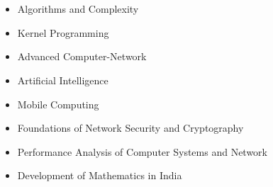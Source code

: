  \hfill \\[-0.4cm]
\hspace*{0.45cm} 
 \hfill \\[-0.8cm]

\begin{multicols}{3}
\begin{itemize}
\item Algorithms and Complexity  \\[-0.6cm]     
\item Kernel Programming \\[-0.6cm]
\item Advanced Computer-Network \\[-0.6cm]
\end{itemize}

\columnbreak
\begin{itemize}
\item Artificial Intelligence \\[-0.6cm]
\item Mobile Computing\\[-0.6cm]
\item Foundations of Network Security and Cryptography\\[-0.6cm]
\end{itemize}

\columnbreak
\begin{itemize}
\item Performance Analysis of Computer Systems and Network \\[-0.6cm]
\item Development of Mathematics in India \\[-0.6cm] 
\end{itemize}

\end{multicols}



